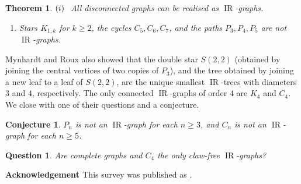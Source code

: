 \documentclass[12pt]{article}%
\newtheorem{theorem}{Theorem}[section]
\newtheorem{conjecture}{Conjecture}[section]
\newtheorem{question}{Question}[section]
\begin{document}
\begin{theorem}
\emph{\cite{26CM-MR}}\hspace{0.1in}$(i)\hspace{0.1in}$All disconnected graphs
can be realised as $\operatorname{IR}$-graphs.

\begin{enumerate}
\item[$(ii)$] Stars $K_{1,k}$ for $k\geq2$, the cycles $C_{5},C_{6},C_{7}$,
and the paths $P_{3},P_{4},P_{5}$ are not $\operatorname{IR}$-graphs.
\end{enumerate}
\end{theorem}

Mynhardt and Roux also showed that the double star $S(2,2)$ (obtained by
joining the central vertices of two copies of $P_{3}$), and the tree obtained
by joining a new leaf to a leaf of $S(2,2)$, are the unique smallest
$\operatorname{IR}$-trees with diameters $3$ and $4$, respectively. The only
connected $\operatorname{IR}$-graphs of order $4$ are $K_{4}$ and $C_{4}$. We
close with one of their questions and a conjecture.

\begin{conjecture}
\emph{\cite{26CM-MR}}\hspace{0.1in}$P_{n}$ is not an $\operatorname{IR}$-graph
for each $n\geq3$, and $C_{n}$ is not an $\operatorname{IR}$-graph for each
$n\geq5$.
\end{conjecture}

\begin{question}
\emph{\cite{26CM-MR}}\hspace{0.1in}Are complete graphs and $C_{4}$ the only
claw-free $\operatorname{IR}$-graphs?
\end{question}

\noindent\textbf{{\Large {\large Acknowledgemen}\textbf{{\Large {\large t}}}%
}\hspace{0.1in}}This survey was published as \cite{MN2019}.

\label{References}
\end{document}
